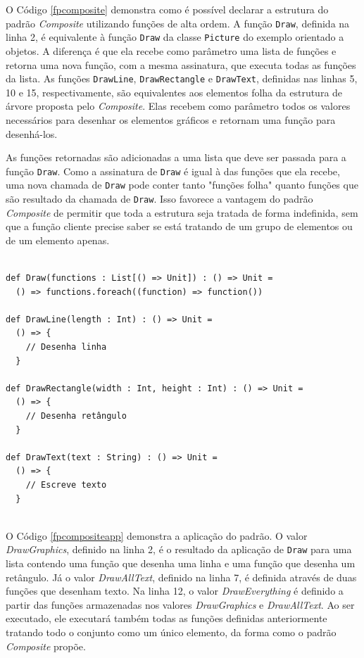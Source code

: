 O Código \ref{fpcomposite} demonstra como é 
possível declarar a estrutura do padrão \textit{Composite} 
utilizando funções de alta ordem. A função 
\texttt{Draw}, definida na linha 2, é equivalente à função 
\texttt{Draw} da classe \texttt{Picture} do exemplo orientado a 
objetos. A diferença é que ela recebe como parâmetro 
uma lista de funções e retorna uma nova função, 
com a mesma assinatura, que executa todas as 
funções da lista. As funções \texttt{DrawLine}, \texttt{DrawRectangle} 
e \texttt{DrawText}, definidas nas linhas 5, 10 e 15, 
respectivamente, são equivalentes aos elementos 
folha da estrutura de árvore proposta pelo 
\textit{Composite}. Elas recebem como parâmetro todos 
os valores necessários para desenhar os elementos 
gráficos e retornam uma função para 
desenhá-los.

As funções retornadas são adicionadas a uma 
lista que deve ser passada para a função \texttt{Draw}. 
Como a assinatura de \texttt{Draw} é igual à das funções 
que ela recebe, uma nova chamada de \texttt{Draw} pode 
conter tanto "funções folha" quanto funções 
que são resultado da chamada de \texttt{Draw}. Isso 
favorece a vantagem do padrão \textit{Composite} de 
permitir que toda a estrutura seja tratada 
de forma indefinida, sem que a função 
cliente precise saber se está tratando de um 
grupo de elementos ou de um elemento apenas. 

\begin{lstlisting}[caption={\textit{Composite} Funcional.},label=fpcomposite]
    
def Draw(functions : List[() => Unit]) : () => Unit =
  () => functions.foreach((function) => function())

def DrawLine(length : Int) : () => Unit =
  () => {
    // Desenha linha
  }

def DrawRectangle(width : Int, height : Int) : () => Unit =
  () => {
    // Desenha retângulo
  }

def DrawText(text : String) : () => Unit =
  () => {
    // Escreve texto
  }
    
\end{lstlisting}

O Código \ref{fpcompositeapp} demonstra a 
aplicação do padrão. O valor \textit{DrawGraphics}, 
definido na linha 2, é o resultado da aplicação 
de \texttt{Draw} para uma lista contendo uma função que 
desenha uma linha e uma função que desenha 
um retângulo. Já o valor \textit{DrawAllText}, definido 
na linha 7, é definida através de duas funções 
que desenham texto. Na linha 12, o valor 
\textit{DrawEverything} é definido a partir das funções 
armazenadas nos valores \textit{DrawGraphics} e 
\textit{DrawAllText}. Ao ser executado, ele executará 
também todas as funções definidas anteriormente 
tratando todo o conjunto como um único elemento, 
da forma como o padrão \textit{Composite} propõe.

